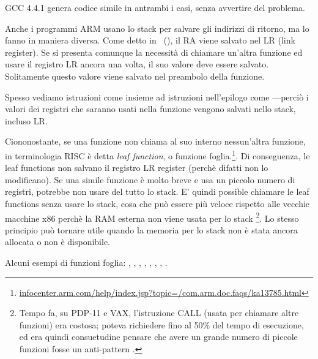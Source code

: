 GCC 4.4.1 genera codice simile in antrambi i casi, senza avvertire del problema.


Anche i programmi ARM usano lo stack per salvare gli indirizzi di ritorno, ma lo fanno in maniera diversa.
Come detto in \q{\HelloWorldSectionName}~(),
il \ac{RA} viene salvato nel \ac{LR} (\gls{link register}).
Se si presenta comunque la necessità di chiamare un'altra funzione ed usare il registro \ac{LR} ancora una volta,
il suo valore deve essere salvato.
Solitamente questo valore viene salvato nel preambolo della funzione.

Spesso vediamo istruzioni come  insieme ad istruzioni nell'epilogo come
---perciò i valori dei registri che saranno usati nella funzione vengono salvati nello stack, incluso \ac{LR}.

Ciononostante, se una funzione non chiama al suo interno nessun'altra funzione, in terminologia \ac{RISC} è detta
\emph{\gls{leaf function}}, o funzione foglia.\footnote{\href{http://infocenter.arm.com/help/index.jsp?topic=/com.arm.doc.faqs/ka13785.html}{infocenter.arm.com/help/index.jsp?topic=/com.arm.doc.faqs/ka13785.html}}.
Di conseguenza, le leaf functions non salvano il registro \ac{LR} register (perchè difatti non lo modificano).
Se una simile funzione è molto breve e usa un piccolo numero di registri, potrebbe non usare del tutto lo stack.
E' quindi possible chiamare le leaf functions senza usare lo stack, cosa che può essere più veloce rispetto alle vecchie macchine x86 perchè la RAM esterna non viene usata per lo stack
\footnote{Tempo fa, su PDP-11 e VAX, l'istruzione CALL (usata per chiamare altre funzioni) era costosa; poteva richiedere fino al 50\%
del tempo di esecuzione, ed era quindi consuetudine pensare che avere un grande numero di piccole funzioni fosse un \gls{anti-pattern} .}.
Lo stesso principio può tornare utile quando la memoria per lo stack non è stata ancora allocata o non è disponibile.

Alcuni esempi di funzioni foglia:
, ,
, , ,
, , .
